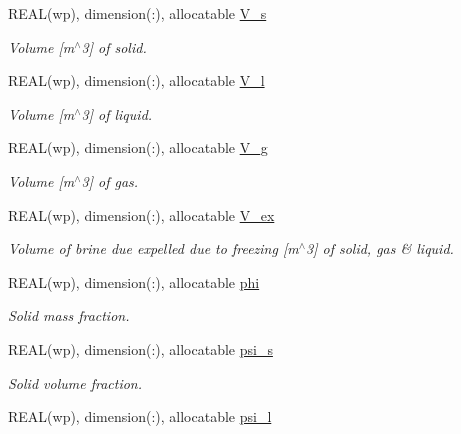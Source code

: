 \begin{DoxyCompactItemize}
REAL(wp), dimension(:), allocatable \hyperlink{namespacemo__data_a77750b1536deb5ddd2ebada202f1cf18}{V\_\-s}
\begin{DoxyCompactList}\small\item\em Volume \mbox{[}m$^\wedge$3\mbox{]} of solid. \item\end{DoxyCompactList}\item 
REAL(wp), dimension(:), allocatable \hyperlink{namespacemo__data_ab24341b1a6dd799e63540fa8ed51d14c}{V\_\-l}
\begin{DoxyCompactList}\small\item\em Volume \mbox{[}m$^\wedge$3\mbox{]} of liquid. \item\end{DoxyCompactList}\item 
REAL(wp), dimension(:), allocatable \hyperlink{namespacemo__data_a274fbc519dd799929a177fdeaec56e91}{V\_\-g}
\begin{DoxyCompactList}\small\item\em Volume \mbox{[}m$^\wedge$3\mbox{]} of gas. \item\end{DoxyCompactList}\item 
REAL(wp), dimension(:), allocatable \hyperlink{namespacemo__data_abb13ad5e80b57e5d614b9888531a3201}{V\_\-ex}
\begin{DoxyCompactList}\small\item\em Volume of brine due expelled due to freezing \mbox{[}m$^\wedge$3\mbox{]} of solid, gas \& liquid. \item\end{DoxyCompactList}\item 
REAL(wp), dimension(:), allocatable \hyperlink{namespacemo__data_ace165f21c4edcf77372b13a99161aec8}{phi}
\begin{DoxyCompactList}\small\item\em Solid mass fraction. \item\end{DoxyCompactList}\item 
REAL(wp), dimension(:), allocatable \hyperlink{namespacemo__data_a655b6d5f770ca3b4a1d2e22b627844e9}{psi\_\-s}
\begin{DoxyCompactList}\small\item\em Solid volume fraction. \item\end{DoxyCompactList}\item 
REAL(wp), dimension(:), allocatable \hyperlink{namespacemo__data_aac8ca74ef10b90da7bf9143bdc21ec3a}{psi\_\-l}

\end{DoxyCompactItemize}
